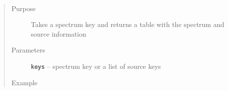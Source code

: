 \documentclass[letterpaper,10pt,english]{sphinxmanual}
\begin{document}
\begin{fulllineitems}
\end{fulllineitems}


\begin{fulllineitems}
\label{api:splat_db.keySpectrum}~\begin{quote}\begin{description}
\item[{Purpose}] \leavevmode
Takes a spectrum key and returns a table with the spectrum and source information

\item[{Parameters}] \leavevmode
\textbf{\texttt{keys}} -- spectrum key or a list of source keys

\item[{Example}] \leavevmode
\end{description}\end{quote}


\end{fulllineitems}
\end{document}
